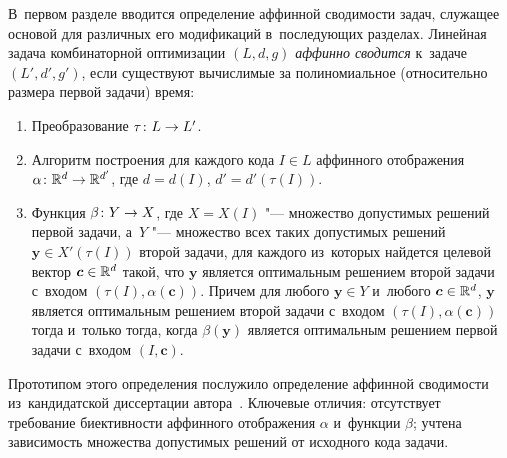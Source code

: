 В~первом разделе вводится определение аффинной сводимости задач, служащее основой для различных его модификаций в~последующих разделах.
Линейная задача комбинаторной оптимизации $(L,d,g)$ \emph{аффинно сводится} к~задаче $(L',d',g')$, если существуют вычислимые за полиномиальное (относительно размера первой задачи) время:
\begin{enumerate}
	\item 
	Преобразование $\tau \colon L \to L'$.
	\item 
	Алгоритм построения для каждого кода $I \in L$ аффинного отображения 
	$\alpha\colon \mathbb{R}^d \to \mathbb{R}^{d'}$, где $d = d(I)$, $d' = d'(\tau(I))$.
	\item 
	Функция $\beta\colon Y \to X$, где $X = X(I)$ "--- множество допустимых решений первой задачи, а~$Y$ "--- множество всех таких допустимых решений $\bm{y} \in X'(\tau(I))$ второй задачи, для каждого из~которых найдется целевой вектор $\bm{c} \in \mathbb{R}^d$ такой, что $\bm{y}$ является оптимальным решением второй задачи с~входом $(\tau(I), \alpha(\bm{c}))$.
	Причем для любого $\bm{y} \in Y$ и~любого $\bm{c} \in \mathbb{R}^d$, $\bm{y}$ является оптимальным решением второй задачи с~входом $(\tau(I), \alpha(\bm{c}))$ тогда и~только тогда, когда $\beta(\bm{y})$ является оптимальным решением первой задачи с~входом $(I,\bm{c})$.
\end{enumerate}

Прототипом этого определения послужило определение аффинной сводимости из~кандидатской диссертации автора~.
Ключевые отличия: отсутствует требование биективности аффинного отображения $\alpha$ и~функции $\beta$; учтена зависимость множества допустимых решений от исходного кода задачи.


